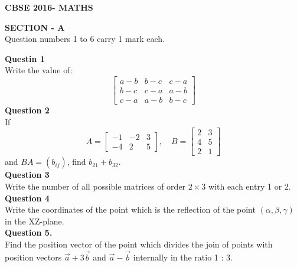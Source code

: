 \documentclass[12pt]{article} \usepackage[utf8]{inputenc}
\begin{document}
\pagestyle{fancy}
\fancyhf{}

\begin{center}
\Large\textbf{CBSE 2016- MATHS}
\end{center}
\begin{center}
    \Large \textbf{SECTION - A} \\

    \normalsize
    Question numbers 1 to 6 carry 1 mark each.
\end{center}

\vspace{1em}

\textbf{Questin 1}\\
 Write the value of:
\[
\begin{bmatrix}
a - b & b - c & c - a \\
b - c & c - a & a - b \\
c - a & a - b & b - c
\end{bmatrix}
\]
\textbf{Question 2}\\
If 
\[
A = \begin{bmatrix} -1 & -2 & 3 \\ -4 & 2 & 5 \end{bmatrix}, 
\quad B = \begin{bmatrix} 2 & 3 \\ 4 & 5 \\ 2 & 1 \end{bmatrix}
\]
and \( BA = (b_{ij}) \), find \( b_{21} + b_{32} \).\\[1em]

\textbf{Question 3}\\
Write the number of all possible matrices of order \( 2 \times 3 \) with each entry 1 or 2.\\[1em]



\textbf{Question 4}\\
Write the coordinates of the point which is the reflection of the point \( (\alpha, \beta, \gamma) \) in the XZ-plane.\\[1em]

\textbf{Question 5.} \\
Find the position vector of the point which divides the join of points with position vectors $\vec{a} + 3\vec{b}$ and $\vec{a} - \vec{b}$ internally in the ratio 1 : 3. \\[1em]
\end{document}
